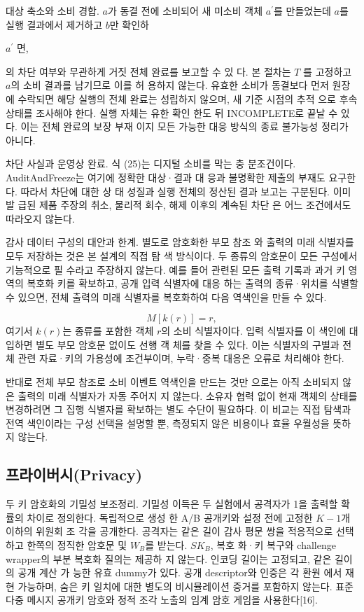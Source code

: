 대상 축소와 소비 경합. \(a\)가 동결 전에 소비되어 새 미소비
객체 \(a^{′}\)를 만들었는데 \(a\)를 실행 결과에서 제거하고 \(b\)만 확인하

\(a^{′}\)
면,

의 차단 여부와 무관하게 거짓 전체 완료를 보고할 수 있
다. 본 절차는 \(T\) 를 고정하고 \(a\)의 소비 결과를 남기므로 이를 허
용하지 않는다. 유효한 소비가 동결보다 먼저 원장에 수락되면
해당 실행의 전체 완료는 성립하지 않으며, 새 기준 시점의 추적
으로 후속 상태를 조사해야 한다. 실행 자체는 유한 확인 한도
뒤 INCOMPLETE로 끝날 수 있다. 이는 전체 완료의 보장 부재
이지 모든 가능한 대응 방식의 종료 불가능성 정리가 아니다.

차단 사실과 운영상 완료. 식 (25)는 디지털 소비를 막는 충
분조건이다. AuditAndFreeze는 여기에 정확한 대상·결과 대
응과 불명확한 제출의 부재도 요구한다. 따라서 차단에 대한 상
태 성질과 실행 전체의 정산된 결과 보고는 구분된다. 이미 발
급된 제품 주장의 취소, 물리적 회수, 해제 이후의 계속된 차단
은 어느 조건에서도 따라오지 않는다.

감사 데이터 구성의 대안과 한계. 별도로 암호화한 부모 참조
와 출력의 미래 식별자를 모두 저장하는 것은 본 설계의 직접 탐
색 방식이다. 두 종류의 암호문이 모든 구성에서 기능적으로 필
수라고 주장하지 않는다. 예를 들어 관련된 모든 출력 기록과
과거 키 영역의 복호화 키를 확보하고, 공개 입력 식별자에 대응
하는 출력의 종류·위치를 식별할 수 있으면, 전체 출력의 미래
식별자를 복호화하여 다음 역색인을 만들 수 있다.

\begin{equation}
    M[k(r)]=r,\tag{26}
\end{equation}
여기서 \(k(r)\)는 종류를 포함한 객체 \(r\)의 소비 식별자이다. 입력
식별자를 이 색인에 대입하면 별도 부모 암호문 없이도 선행 객
체를 찾을 수 있다. 이는 식별자의 구별과 전체 관련 자료·키의
가용성에 조건부이며, 누락·중복 대응은 오류로 처리해야 한다.

반대로 전체 부모 참조로 소비 이벤트 역색인을 만드는 것만
으로는 아직 소비되지 않은 출력의 미래 식별자가 자동 주어지
지 않는다. 소유자 협력 없이 현재 객체의 상태를 변경하려면 그
집행 식별자를 확보하는 별도 수단이 필요하다. 이 비교는 직접
탐색과 전역 색인이라는 구성 선택을 설명할 뿐, 측정되지 않은
비용이나 효율 우월성을 뜻하지 않는다.


\subsection{프라이버시(Privacy)}
두 키 암호화의 기밀성 보조정리. 기밀성 이득은 두 실험에서
공격자가 1을 출력할 확률의 차이로 정의한다. 독립적으로 생성
한 A/B 공개키와 설정 전에 고정한 \(K−1\)개 이하의 위원회 조
각을 공개한다. 공격자는 같은 길이 감사 평문 쌍을 적응적으로
선택하고 한쪽의 정직한 암호문 및 \(W_{B}\)를 받는다. \(SK_{B}\), 복호
화·키 복구와 challenge wrapper의 부분 복호화 질의는 제공하
지 않는다. 인코딩 길이는 고정되고, 같은 길이의 공개 계산 가
능한 유효 dummy가 있다. 공개 descriptor와 인증은 각 환원
에서 재현 가능하며, 숨은 키 일치에 대한 별도의 비시뮬레이션
증거를 포함하지 않는다. 표준 다중 메시지 공개키 암호와 정적
조각 노출의 임계 암호 게임을 사용한다[16].

